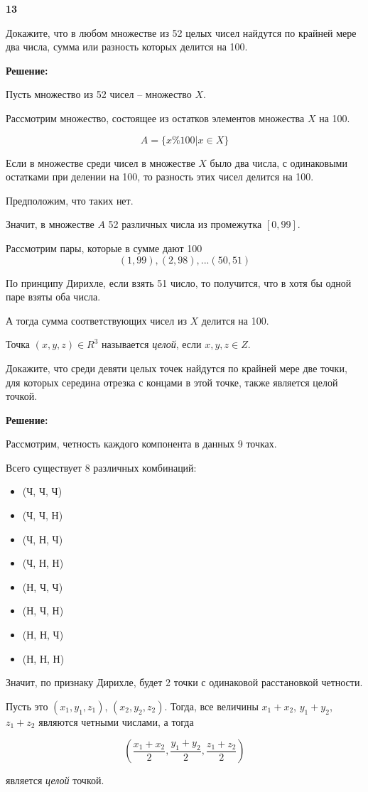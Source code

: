 \documentclass{article}
\begin{document}
\textbf{13}

Докажите, что в любом множестве из 52 целых чисел найдутся по крайней мере два числа, сумма или разность которых делится на 100.

\textbf{Решение:}

Пусть множество из 52 чисел -- множество $X$. 

Рассмотрим множество, состоящее из остатков элементов множества  $X$ на 100. 

$$ A = \{ x \% 100 | x \in X \}$$

Если в множестве среди чисел в множестве $X$ было два числа, с одинаковыми остатками при делении на 100, то разность этих чисел делится на 100. 

Предположим, что таких нет.

Значит, в множестве $A$ 52 различных числа  из промежутка $[0, 99]$. 

Рассмотрим пары, которые в сумме дают 100 $$(1, 99), (2, 98), ... (50, 51)$$

По принципу Дирихле, если взять 51 число, то получится, что в хотя бы одной паре взяты оба числа. 

А тогда сумма соответствующих чисел из $X$ делится на 100.

\newpage

Точка $(x, y, z) \in R^3$ называется \textit{целой}, если $x, y, z \in Z$.

Докажите, что среди девяти целых точек найдутся по крайней мере две точки, для которых середина отрезка с концами в этой точке, также является целой точкой. 

\textbf{Решение:}

Рассмотрим, четность каждого компонента в данных 9 точках. 

Всего существует 8 различных комбинаций: 

\begin{itemize}
    \item (Ч, Ч, Ч)
    \item (Ч, Ч, Н)
    \item (Ч, Н, Ч)
    \item (Ч, Н, Н)
    \item (Н, Ч, Ч)
    \item (Н, Ч, Н)
    \item (Н, Н, Ч)
    \item (Н, Н, Н)
\end{itemize}

Значит, по признаку Дирихле, будет 2 точки с одинаковой расстановкой четности. 

Пусть это $(x_1, y_1, z_1)$, $(x_2, y_2, z_2)$. Тогда, все величины $x_1 + x_2$, $y_1 + y_2$, $z_1 + z_2$  являются четными числами, а тогда

$$\left(\frac{x_1 + x_2}{2}, \frac{y_1 + y_2}{2}, \frac{z_1 + z_2}{2}\right)$$

является \textit{целой} точкой.
\end{document}
